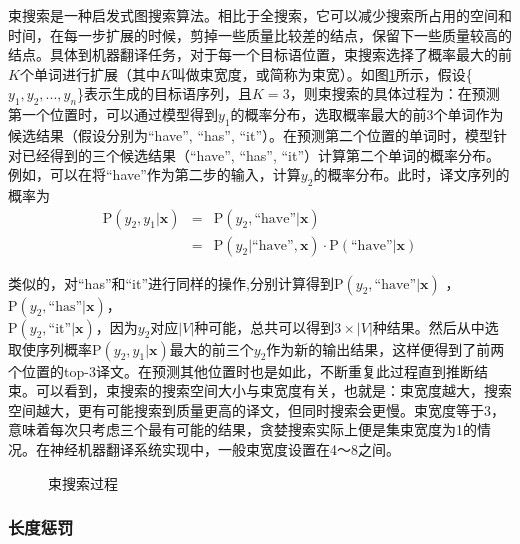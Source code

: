 \parinterval 束搜索是一种启发式图搜索算法。相比于全搜索，它可以减少搜索所占用的空间和时间，在每一步扩展的时候，剪掉一些质量比较差的结点，保留下一些质量较高的结点。具体到机器翻译任务，对于每一个目标语位置，束搜索选择了概率最大的前$K$个单词进行扩展（其中$K$叫做束宽度，或简称为束宽）。如图\ref{fig:6-34}所示，假设\{$y_1, y_2,..., y_n$\}表示生成的目标语序列，且$K=3$，则束搜索的具体过程为：在预测第一个位置时，可以通过模型得到$y_1$的概率分布，选取概率最大的前3个单词作为候选结果（假设分别为``have'', ``has'', ``it''）。在预测第二个位置的单词时，模型针对已经得到的三个候选结果（``have'', ``has'', ``it''）计算第二个单词的概率分布。例如，可以在将``have''作为第二步的输入，计算$y_2$的概率分布。此时，译文序列的概率为
\begin{eqnarray}
\textrm{P} (y_2,y_1 | \mathbf{x}) & = & \textrm{P} (y_2, \textrm{``have''} | \mathbf{x}) \nonumber \\
								  & = & \textrm{P}(y_2 | \textrm{``have''} , \mathbf{x}) \cdot \textrm{P} (\textrm{``have''} | \mathbf{x})								
\label{eq:6-38}
\end{eqnarray}

\noindent 类似的，对``has''和``it''进行同样的操作,分别计算得到$ \textrm{P} (y_2, \textrm{``have''} | \mathbf{x})$ ，$ \textrm{P} (y_2, \textrm{``has''} | \mathbf{x})$，\\ $ \textrm{P} (y_2, \textrm{``it''} | \mathbf{x})$，因为$y_2$对应$|V|$种可能，总共可以得到$3 \times |V|$种结果。然后从中选取使序列概率$\textrm{P}(y_2,y_1| \mathbf{x})$最大的前三个$y_2$作为新的输出结果，这样便得到了前两个位置的top-3译文。在预测其他位置时也是如此，不断重复此过程直到推断结束。可以看到，束搜索的搜索空间大小与束宽度有关，也就是：束宽度越大，搜索空间越大，更有可能搜索到质量更高的译文，但同时搜索会更慢。束宽度等于3，意味着每次只考虑三个最有可能的结果，贪婪搜索实际上便是集束宽度为1的情况。在神经机器翻译系统实现中，一般束宽度设置在4～8之间。

\begin{figure}[htp]
\centering

\caption{束搜索过程}
\label{fig:6-34}
\end{figure}


\subsubsection{长度惩罚}

